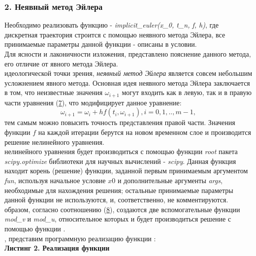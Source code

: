 \subsubsection{2. Неявный метод Эйлера}
\hspace*{\parindent}Необходимо реализовать функцию 
- \textit{implicit_euler(x_0, t_n, f, h)},  где дискретная траектория строится с помощью неявного метода Эйлера, все принимаемые параметры данной функции - описаны в условии. \\
Для ясности и лаконичности изложения, представлено пояснение данного метода, его отличие от явного метода Эйлера. \\
 идеологической точки зрения, \textit{неявный метод Эйлера} является совсем небольшим усложнением явного метода. Основная идея неявного метода Эйлера заключается в том, что неизвестные значения $\omega_{i+1}$ могут входить как в левую, так и в правую части уравнения (\hyperlink{res1}{7}), что модифицирует данное уравнение:
\hypertarget{res3}{}
\begin{equation}
     \omega_{i+1} = \omega_i + hf(t_i, \omega_{i+1}), i = 0, 1,.., m-1,
\end{equation}
тем самым можно повысить точность представления правой части.
Значения функции $f$ на каждой итерации берутся на новом временном слое и производится решение нелинейного уравнения. \\
 нелинейного уравнения будет производиться с помощью функции \textit{root} пакета \textit{scipy.optimize} библиотеки для научных вычислений - \textit{scipy}.
Данная функция  находит корень (решение) функции, заданной первым принимаемым аргументом \textit{fun}, используя начальное условие $x0$ и дополнительные аргументы \textit{args}, необходимые для нахождения решения; остальные принимаемые параметры данной функции не используются, и, соответственно, не комментируются.
\\
 образом, согласно соотношению (\hyperlink{res3}{8}), создаются две вспомогательные функции \textit{mod_v} и \textit{mod_u}, относительное которых и будет производиться решение с помощью функции .\\
, представим программную реализацию функции :\\
\textbf{Листинг 2. Реализация функции }
\hypertarget{lst2}{}

